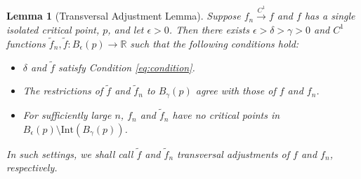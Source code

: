\documentclass[11pt]{article}
\newcommand{\1}{\mathbf{1}}
\newtheorem{lemma}{Lemma}%
\theoremstyle{definition}
\theoremstyle{remark}
\begin{document}
\begin{mdframed}
    \begin{lemma}[Transversal Adjustment Lemma]\label{lem:transversal} Suppose $f_n\xrightarrow{C^1}f$ and $f$ has a single isolated critical point, $p$, and let $\epsilon > 0$. Then there exists $\epsilon > \delta > \gamma > 0$ and $C^1$ functions $\tilde{f}_n,\tilde{f}:B_\epsilon(p)\rightarrow \mathbb{R}$ such that the following conditions hold:
    \begin{itemize}
        \item[(i)] $\delta$ and $\tilde{f}$ satisfy Condition \eqref{eq:condition}.
        \item[(ii)] The restrictions of $\tilde{f}$ and $\tilde{f}_n$ to $B_{\gamma}(p)$ agree with those of $f$ and $f_n$.
        \item[(iii)] For sufficiently large $n$, $f_n$ and $\tilde{f}_n$ have no critical points in $B_\epsilon(p)\setminus \text{Int}(B_\gamma(p))$.
    \end{itemize}  
    In such settings, we shall call $\tilde{f}$ and $\tilde{f}_n$ transversal adjustments of $f$ and $f_n$, respectively.\end{lemma}
    
    \vspace{0.3cm}
\end{mdframed}
\end{document}

